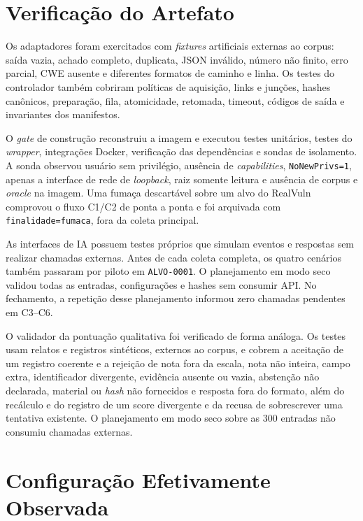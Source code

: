 \section{Verificação do Artefato}\label{sec:verificacao-artefato-desenvolvimento}

Os adaptadores foram exercitados com \textit{fixtures} artificiais externas ao corpus: saída vazia, achado completo, duplicata, JSON inválido, número não finito, erro parcial, CWE ausente e diferentes formatos de caminho e linha. Os testes do controlador também cobriram políticas de aquisição, links e junções, hashes canônicos, preparação, fila, atomicidade, retomada, timeout, códigos de saída e invariantes dos manifestos.

O \textit{gate} de construção reconstruiu a imagem e executou testes unitários, testes do \textit{wrapper}, integrações Docker, verificação das dependências e sondas de isolamento. A sonda observou usuário sem privilégio, ausência de \textit{capabilities}, \texttt{NoNewPrivs=1}, apenas a interface de rede de \textit{loopback}, raiz somente leitura e ausência de corpus e \textit{oracle} na imagem. Uma fumaça descartável sobre um alvo do RealVuln comprovou o fluxo C1/C2 de ponta a ponta e foi arquivada com \texttt{finalidade=fumaca}, fora da coleta principal.

As interfaces de IA possuem testes próprios que simulam eventos e respostas sem realizar chamadas externas. Antes de cada coleta completa, os quatro cenários também passaram por piloto em \texttt{ALVO-0001}. O planejamento em modo seco validou todas as entradas, configurações e hashes sem consumir API. No fechamento, a repetição desse planejamento informou zero chamadas pendentes em C3--C6.

O validador da pontuação qualitativa foi verificado de forma análoga. Os testes usam relatos e registros sintéticos, externos ao corpus, e cobrem a aceitação de um registro coerente e a rejeição de nota fora da escala, nota não inteira, campo extra, identificador divergente, evidência ausente ou vazia, abstenção não declarada, material ou \textit{hash} não fornecidos e resposta fora do formato, além do recálculo e do registro de um score divergente e da recusa de sobrescrever uma tentativa existente. O planejamento em modo seco sobre as 300 entradas não consumiu chamadas externas.

\section{Configuração Efetivamente Observada}\label{sec:registro-configuracao-desenvolvimento}

